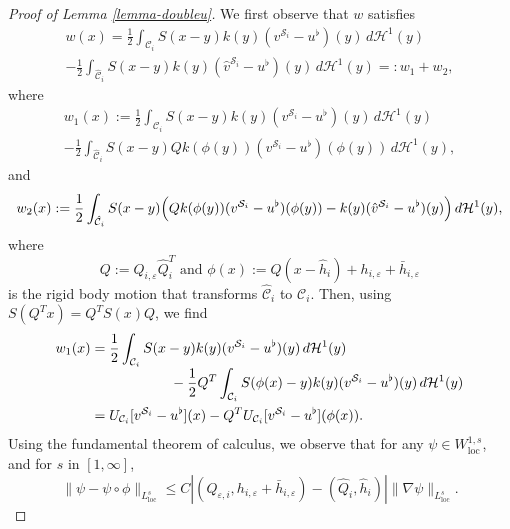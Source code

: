 \documentclass[10pt]{amsart}
\let\eps\varepsilon
\newcommand{\dd}{\,d}
\newcommand{\loc}{\mathrm{loc}}
\theoremstyle{definition}
\theoremstyle{remark}
\begin{document}
\begin{proof}[Proof of Lemma \ref{lemma-doubleu}]
We first observe that $w$ satisfies\vspace*{-3pt}
\begin{multline*}
w(x) = \frac12\int_{\mathcal C_i} S(x-y) k(y) (v^{{\mathcal S}_i} - u^\flat)(y) \dd \mathcal H^1(y)
\\[-5pt]
- \frac12 \int_{\hat {\mathcal C}_i} S(x-y) k(y) (\hat v^{{\mathcal S}_i} - u^\flat)(y) \dd \mathcal H^1(y) =: w_1 + w_2,
\end{multline*}
where\vspace*{-3pt}
\begin{multline*}
w_1 (x):= \frac12 \int_{\mathcal C_i} S(x-y) k(y) (v^{{\mathcal S}_i} - u^\flat)(y) \dd \mathcal H^1(y) \\[-5pt]
- \frac12 \int_{\hat {\mathcal C}_i} S(x-y) Q k(\phi(y)) (v^{{\mathcal S}_i} - u^\flat)(\phi(y)) \dd \mathcal H^1(y),
\end{multline*}
and\vspace*{-3pt}
\begin{equation*}
w_2 (x) := \frac12 \int_{\hat {\mathcal C}_i} S(x-y) \Bigl(Q k(\phi(y)) (v^{{\mathcal S}_i} - u^\flat)(\phi(y)) - k(y)(\hat v^{{\mathcal S}_i} - u^\flat)(y) \Bigr) \dd \mathcal H^1(y),
\end{equation*}
where\vspace*{-3pt}
\[
Q:=Q_{i,\eps} \hat Q_{i}^T
\text{ and } \phi(x) := Q (x - \hat h_i) + h_{i,\eps} + \bar h_{i,\eps}
\]
is the rigid body motion that transforms $\hat {\mathcal C}_i$ to ${\mathcal C}_i$.
Then, using $S(Q^Tx) = Q^T S(x) Q$, we find\vspace*{-3pt}
\begin{align*}
w_1(x) &= \frac12 \int_{\mathcal C_i} S(x-y) k(y) (v^{{\mathcal S}_i} - u^\flat)(y) \dd \mathcal H^1(y) \\[-3pt]
&\hspace*{2cm} - \frac12 Q^T \int_{\mathcal C_i} S(\phi(x)-y) k(y) (v^{{\mathcal S}_i} - u^\flat)(y) \dd \mathcal H^1(y) \\
&= U_{\mathcal C_i}[v^{{\mathcal S}_i} - u^\flat](x)- Q^T U_{\mathcal C_i}[v^{{\mathcal S}_i} - u^\flat](\phi(x)).
\end{align*}
Using the fundamental theorem of calculus, we observe that for any $\psi \in W^{1,s}_\loc$, and for $s$ in $[1,\infty]$,\vspace*{-3pt}
\begin{equation} \label{est:Poincare.psi}
\|\psi - \psi \circ \phi\|_{L^s_\loc} \leq C |(Q_{\eps,i},h_{i,\eps} + \bar h_{i,\eps}) - (\hat Q_i,\hat h_i)| \|\nabla \psi\|_{L^s_\loc}.

\end{equation}
\end{proof}
\end{document}
